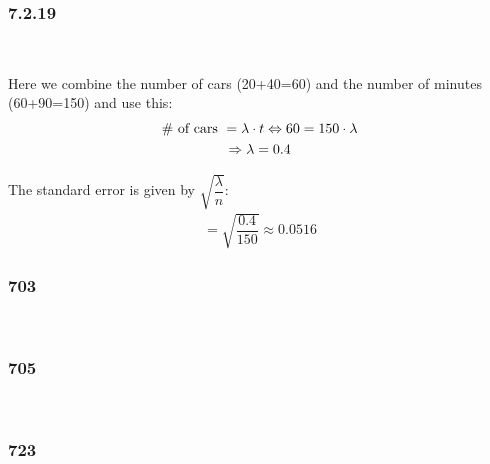\subsubsection{7.2.19}\hfill\\\par
\noindent Here we combine the number of cars (20+40=60) and the number of minutes (60+90=150) and use this:
\begin{equation*}
  \begin{gathered}
    \text{\# of cars } = \lambda\cdot t\Leftrightarrow 60 = 150\cdot\lambda\\
    \Rightarrow\lambda =0.4
  \end{gathered}
\end{equation*}\par
\noindent The standard error is given by $\sqrt{\dfrac{\lambda}{n}}$:
\begin{equation*}
  \begin{gathered}
    = \sqrt{\dfrac{0.4}{150}}\approx 0.0516
  \end{gathered}
\end{equation*}
\par\bigskip
\subsubsection{703}\hfill\\\par
\par\bigskip
\subsubsection{705}\hfill\\\par
\par\bigskip
\subsubsection{723}\hfill\\\par
\par\bigskip

